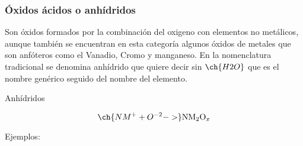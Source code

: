 \subsubsection*{Óxidos ácidos o anhídridos}
Son óxidos formados por la combinación del oxigeno con elementos no metálicos, aunque también se encuentran en esta categoría algunos óxidos de metales que son anfóteros como el Vanadio, Cromo y manganeso. En la nomenclatura tradicional se denomina anhídrido que quiere decir sin $\ch{H2O}$ que es el nombre genérico seguido del nombre del elemento.
\begin{Theorem*} {Anhídridos}
	\begin{figure}[H]
		\centering
	\end{figure}
	$$\ch{NM^{+} + O^{-2} ->}\mathrm{NM}_2\mathrm{O}_x$$
\end{Theorem*}
\noindent Ejemplos:
